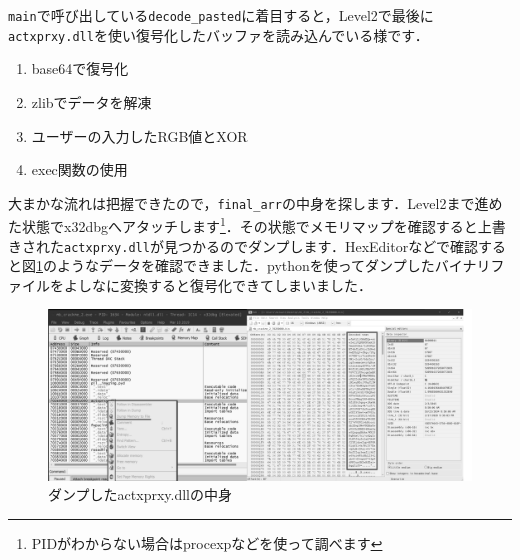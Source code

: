 \texttt{main}で呼び出している\texttt{decode\_pasted}に着目すると，Level2で最後に\faCog \,\texttt{actxprxy.dll}を使い復号化したバッファを読み込んでいる様です．
\begin{enumerate}
  \item base64で復号化
  \item zlibでデータを解凍
  \item ユーザーの入力したRGB値とXOR
  \item exec関数の使用
\end{enumerate}
大まかな流れは把握できたので，\texttt{final\_arr}の中身を探します．Level2まで進めた状態でx32dbgへアタッチします\footnote{PIDがわからない場合はprocexpなどを使って調べます}．その状態でメモリマップを確認すると上書きされた\texttt{actxprxy.dll}が見つかるのでダンプします．HexEditorなどで確認すると図\ref{fig:debug_dll}のようなデータを確認できました．pythonを使ってダンプしたバイナリファイルをよしなに変換すると復号化できてしまいました．
\begin{figure}[H]
    \centering
    \includegraphics[width=\linewidth]{./assets/takuzoo3868asset/attach_mb_gray.png}
    \caption{ダンプしたactxprxy.dllの中身}
    \label{fig:debug_dll}
\end{figure}
